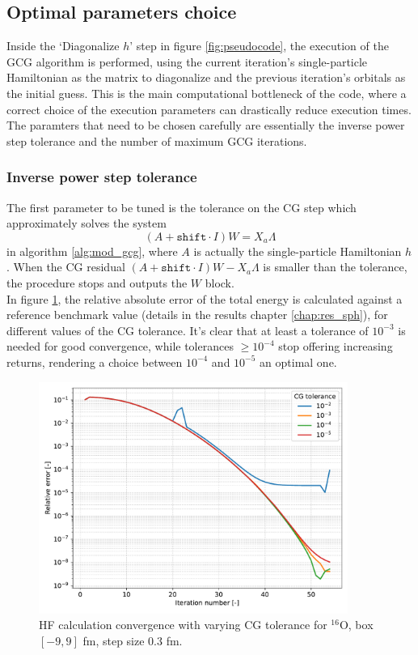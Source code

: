 \subsection{Optimal parameters choice}
Inside the `Diagonalize $h$' step in figure \ref{fig:pseudocode}, the execution of the GCG algorithm is performed, using the current iteration's single-particle Hamiltonian as the matrix to diagonalize and the previous iteration's orbitals as the initial guess. This is the main computational bottleneck of the code, where a correct choice of the execution parameters can drastically reduce execution times.
The paramters that need to be chosen carefully are essentially the inverse power step tolerance and the number of maximum GCG iterations.
\subsubsection{Inverse power step tolerance}
The first parameter to be tuned is the tolerance on the CG step which approximately solves the system \begin{equation}
    (A+ \texttt{shift}\cdot I)W = X_a\Lambda
\end{equation}
in algorithm \ref{alg:mod_gcg}, where $A$ is actually the single-particle Hamiltonian $h$.
When the CG residual $(A+ \texttt{shift}\cdot I)W -  X_a\Lambda$ is smaller than the tolerance, the procedure stops and outputs the $W$ block.
\\In figure \ref{fig:conv_tol}, the relative absolute error of the total energy is calculated against a reference benchmark value (details in the results chapter \ref{chap:res_sph}), for different values of the CG tolerance. It's clear that at least a tolerance of $10^{-3}$ is needed for good convergence, while tolerances $\ge 10^{-4}$ stop offering increasing returns, rendering a choice between $10^{-4}$ and $10^{-5}$ an optimal one.
\begin{figure}[H]
    \centering
    \includegraphics[width=0.9\textwidth]{Images/conv_tol.pdf}
    \caption{HF calculation convergence with varying CG tolerance for $^{16}$O, box $[-9, 9]$ fm, step size $0.3$ fm.} 
    \label{fig:conv_tol}
\end{figure}
